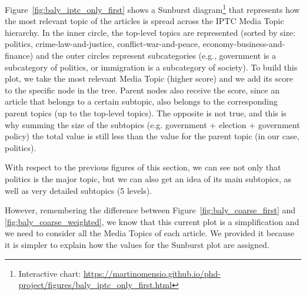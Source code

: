 Figure~\ref{fig:baly_iptc_only_first}  
shows a Sunburst diagram\footnote{Interactive chart: \url{https://martinomensio.github.io/phd-project/figures/baly_iptc_only_first.html}} that represents how the most relevant topic of the articles is spread across the IPTC Media Topic hierarchy.
In the inner circle, the top-level topics are represented (sorted by size: politics, crime-law-and-justice, conflict-war-and-peace, economy-business-and-finance) and the outer circles represent subcategories (e.g., government is a subcategory of politics, or immigration is a subcategory of society).
To build this plot, we take the most relevant Media Topic (higher score) and we add its score to the specific node in the tree. Parent nodes also receive the score, since an article that belongs to a certain subtopic, also belongs to the corresponding parent topics (up to the top-level topics). The opposite is not true, and this is why summing the size of the subtopics (e.g. government + election + government policy) the total value is still less than the value for the parent topic (in our case, politics).


With respect to the previous figures of this section, we can see not only that politics is the major topic, but we can also get an idea of its main subtopics, as well as very detailed subtopics (5 levels).

However, remembering the difference between Figure~\ref{fig:baly_coarse_first} and \ref{fig:baly_coarse_weighted}, we know that this current plot is a simplification and we need to consider all the Media Topics of each article.
We provided it because it is simpler to explain how the values for the Sunburst plot are assigned.


